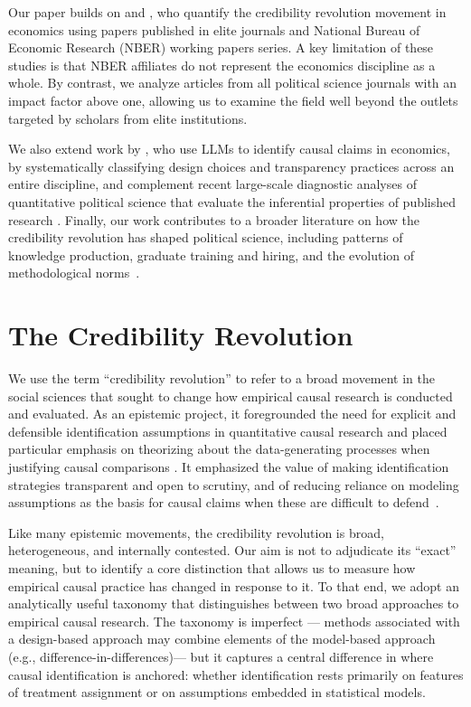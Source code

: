 \documentclass[12pt]{article}
\begin{document}
Our paper builds on \citet{currie2020technology} and \citet{goldsmith2024tracking}, who quantify the credibility revolution movement in economics using papers published in elite journals and National Bureau of Economic Research (NBER) working papers series. A key limitation of these studies is that NBER affiliates do not represent the economics discipline as a whole. By contrast, we analyze articles from all political science journals with an impact factor above one, allowing us to examine the field well beyond the outlets targeted by scholars from elite institutions. 

We also extend work by \citet{garg2025causal}, who use LLMs to identify causal claims in economics, by systematically classifying design choices and transparency practices across an entire discipline, and complement recent large-scale diagnostic analyses of quantitative political science that evaluate the inferential properties of published research \citep{arelBundock2026underpowered}. Finally, our work contributes to a broader literature on how the credibility revolution has shaped political science, including patterns of knowledge production, graduate training and hiring, and the evolution of methodological norms~\citep{grossman2025political}.

\section*{The Credibility Revolution}\label{sec:ourapproach}

We use the term ``credibility revolution'' to refer to a broad movement in the social sciences that sought to change how empirical causal research is conducted and evaluated. As an epistemic project, it foregrounded the need for explicit and defensible identification assumptions in quantitative causal research and placed particular emphasis on theorizing about the data-generating processes when justifying causal comparisons \citep{morgan2014counterfactuals, imbens2015causal}. It emphasized the value of making identification strategies transparent and open to scrutiny, and of reducing reliance on modeling assumptions as the basis for causal claims when these are difficult to defend~\citep{aronow2019foundations, samii2016}.

Like many epistemic movements, the credibility revolution is broad, heterogeneous, and internally contested. Our aim is not to adjudicate its ``exact'' meaning, but to identify a core distinction that allows us to measure how empirical causal practice has changed in response to it. To that end, we adopt an analytically useful taxonomy that distinguishes between two broad approaches to empirical causal research. The taxonomy is imperfect --- methods associated with a design-based approach may combine elements of the model-based approach (e.g., difference-in-differences)--- but it captures a central difference in where causal identification is anchored: whether identification rests primarily on features of treatment assignment or on assumptions embedded in statistical models.
\end{document}
